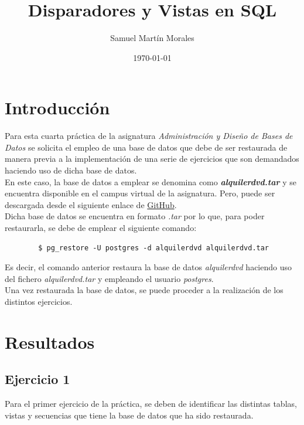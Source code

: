 \documentclass{report}
\begin{document}
	
	
	\title{Disparadores y Vistas en SQL}
	\author{Samuel Martín Morales}
	\date{\today}
	
	\maketitle
	
	\tableofcontents
	
	\chapter{Introducción}
  Para esta cuarta práctica de la asignatura \emph{Administración y Diseño de Bases de Datos} se solicita el empleo de una base de datos que debe de ser restaurada de manera previa a la implementación de una serie de ejercicios que son demandados haciendo uso de dicha base de datos.\\

	En este caso, la base de datos a emplear se denomina como \emph{\textbf{alquilerdvd.tar}} y se encuentra disponible en el campus virtual de la asignatura. Pero, puede ser descargada desde el siguiente enlace de \href{https://github.com/Samuelmm15/PostgreSQL-Rent/blob/main/AlquilerPractica.tar}{GitHub}.\\

	Dicha base de datos se encuentra en formato \emph{.tar} por lo que, para poder restaurarla, se debe de emplear el siguiente comando:

	\begin{verbatim}
		$ pg_restore -U postgres -d alquilerdvd alquilerdvd.tar
	\end{verbatim}

	Es decir, el comando anterior restaura la base de datos \emph{alquilerdvd} haciendo uso del fichero \emph{alquilerdvd.tar} y empleando el usuario \emph{postgres}.\\

	Una vez restaurada la base de datos, se puede proceder a la realización de los distintos ejercicios.\\

	\chapter{Resultados}
	\section{Ejercicio 1}
	Para el primer ejercicio de la práctica, se deben de identificar las distintas tablas, vistas y secuencias que tiene la base de datos que ha sido restaurada.\\
\end{document}
